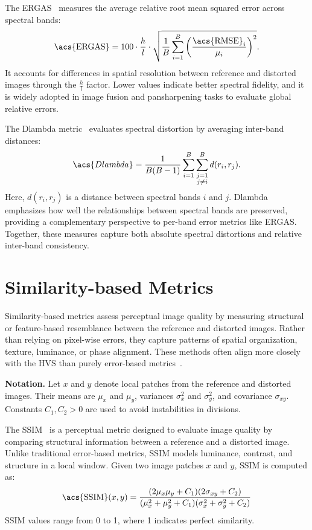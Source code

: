 The \acf{ERGAS}~\cite{wald2000ergas,zhang2008ergas} measures the average relative root mean squared error across spectral bands:
\begin{equation}
\text{\acs{ERGAS}} = 100 \cdot \frac{h}{l} \cdot \sqrt{ \frac{1}{B} \sum_{i=1}^{B} \left( \frac{\text{\acs{RMSE}}_i}{\mu_i} \right)^2 } .
\end{equation}
It accounts for differences in spatial resolution between reference and distorted images through the $\tfrac{h}{l}$ factor. 
Lower values indicate better spectral fidelity, and it is widely adopted in image fusion and pansharpening tasks 
to evaluate global relative errors.

The \acs{Dlambda} metric~\cite{wald2000ergas} evaluates spectral distortion by averaging inter-band distances:
\begin{equation}
\acs{Dlambda} = \frac{1}{B(B-1)} \sum_{i=1}^{B} \sum_{\substack{j=1 \\ j \neq i}}^{B} d(r_i, r_j) .
\end{equation}
Here, $d(r_i, r_j)$ is a distance between spectral bands $i$ and $j$. 
\acs{Dlambda} emphasizes how well the relationships between spectral bands are preserved, 
providing a complementary perspective to per-band error metrics like \acs{ERGAS}. 
Together, these measures capture both absolute spectral distortions and relative inter-band consistency.

\section{Similarity-based Metrics}\label{app:sec:similarity_based_metrics}

Similarity-based metrics assess perceptual image quality by measuring structural or feature-based resemblance between the reference and distorted images. Rather than relying on pixel-wise errors, they capture patterns of spatial organization, texture, luminance, or phase alignment. These methods often align more closely with the \acs{HVS} than purely error-based metrics~\cite{wang2004image, xue2014gmsd}.

\noindent\textbf{Notation.}  
Let $x$ and $y$ denote local patches from the reference and distorted images. Their means are $\mu_x$ and $\mu_y$, variances $\sigma_x^2$ and $\sigma_y^2$, and covariance $\sigma_{xy}$. Constants $C_1, C_2 > 0$ are used to avoid instabilities in divisions.

The \acf{SSIM}~\cite{wang2004image} is a perceptual metric designed to evaluate image quality by comparing structural information between a reference and a distorted image. Unlike traditional error-based metrics, \acs{SSIM} models luminance, contrast, and structure in a local window. Given two image patches $x$ and $y$, \acs{SSIM} is computed as:
\begin{equation}
\text{\acs{SSIM}}(x, y) = \frac{(2 \mu_x \mu_y + C_1)(2 \sigma_{xy} + C_2)}{(\mu_x^2 + \mu_y^2 + C_1)(\sigma_x^2 + \sigma_y^2 + C_2)}
\end{equation}
\acs{SSIM} values range from 0 to 1, where 1 indicates perfect similarity.

